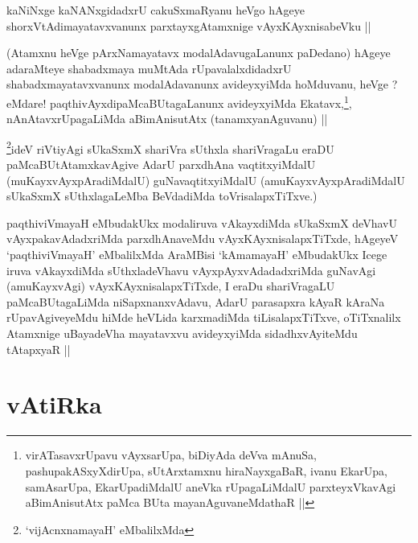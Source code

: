 
\begin{artha}
kaNiNxge kaNANxgidadxrU cakuSxmaRyanu heVgo hAgeye
shorxVtAdimayatavxvanunx parxtayxgAtamxnige vAyxKAyxnisabeVku ||
\end{artha}


\begin{artha}
(Atamxnu heVge pArxNamayatavx modalAdavugaLanunx paDedano) hAgeye
  adaraMteye shabadxmaya muMtAda rUpavalalxdidadxrU
  shabadxmayatavxvanunx modalAdavanunx avideyxyiMda hoMduvanu, heVge ?
  eMdare! paqthivAyxdipaMcaBUtagaLanunx avideyxyiMda
  Ekatavx,\footnote{virATasavxrUpavu vAyxsarUpa, biDiyAda deVva
    mAnuSa, pashupakASxyXdirUpa, sUtArxtamxnu hiraNayxgaBaR, ivanu
    EkarUpa, samAsarUpa, EkarUpadiMdalU aneVka rUpagaLiMdalU
    parxteyxVkavAgi aBimAnisutAtx paMca BUta mayanAguvaneMdathaR ||}, nAnAtavx\footnotemark rUpagaLiMda aBimAnisutAtx
  (tanamxyanAguvanu) ||
\end{artha}

\begin{artha}
\footnote{`vijAcnxnamayaH' eMbalilxMda}ideV riVtiyAgi sUkaSxmX shariVra sUthxla shariVragaLu eraDU
paMcaBUtAtamxkavAgive AdarU parxdhAna vaqtitxyiMdalU
(muKayxvAyxpAradiMdalU) guNavaqtitxyiMdalU (amuKayxvAyxpAradiMdalU
sUkaSxmX sUthxlagaLeMba BeVdadiMda toVrisalapxTiTxve.)
\end{artha}

\begin{artha}
paqthiviVmayaH eMbudakUkx modaliruva vAkayxdiMda sUkaSxmX deVhavU
vAyxpakavAdadxriMda parxdhAnaveMdu vAyxKAyxnisalapxTiTxde, hAgeyeV
`paqthiviVmayaH' eMbalilxMda AraMBisi `kAmamayaH' eMbudakUkx Icege
iruva vAkayxdiMda sUthxladeVhavu vAyxpAyxvAdadadxriMda guNavAgi
(amuKayxvAgi) vAyxKAyxnisalapxTiTxde, I eraDu shariVragaLU
paMcaBUtagaLiMda niSapxnanxvAdavu, AdarU parasapxra kAyaR kAraNa
rUpavAgiveyeMdu hiMde heVLida karxmadiMda tiLisalapxTiTxve,
oTiTxnalilx Atamxnige uBayadeVha mayatavxvu avideyxyiMda
sidadhxvAyiteMdu tAtapxyaR ||
\end{artha}

\section*{vAtiRka}


